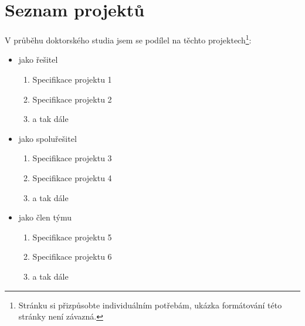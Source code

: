 \chapter*{Seznam projektů}
\label{sec:ListOfProjects}
V průběhu doktorského studia jsem se podílel na těchto projektech\footnote{Stránku si přizpůsobte individuálním potřebám, ukázka formátování této stránky není závazná.}:
\begin{itemize}
	\item jako řešitel
		\begin{enumerate}
			\item Specifikace projektu 1
			\item Specifikace projektu 2
			\item a tak dále
		\end{enumerate}

	\item jako spoluřešitel
		\begin{enumerate}[resume]
			\item Specifikace projektu 3
			\item Specifikace projektu 4
			\item a tak dále
		\end{enumerate}

	\item jako člen týmu
		\begin{enumerate}[resume]
			\item Specifikace projektu 5
			\item Specifikace projektu 6
			\item a tak dále
		\end{enumerate}
\end{itemize}

\endinput